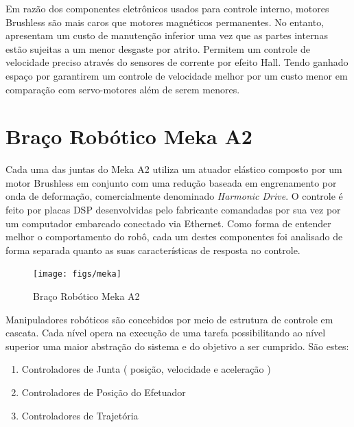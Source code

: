 Em razão dos componentes eletrônicos usados para controle interno, motores Brushless são mais caros que motores magnéticos permanentes. No entanto, apresentam um custo de manutenção inferior uma vez que as partes internas estão sujeitas a um menor desgaste por atrito. Permitem um controle de velocidade preciso através do sensores de corrente por efeito Hall. Tendo ganhado espaço por garantirem um controle de velocidade melhor por um custo menor em comparação com servo-motores além de serem menores.


\section{Braço Robótico Meka A2}

Cada uma das juntas do Meka A2 utiliza um atuador elástico composto por um motor Brushless em conjunto com uma redução baseada em engrenamento por onda de deformação, comercialmente denominado \textit{Harmonic Drive}. O controle é feito por placas DSP desenvolvidas pelo fabricante comandadas por sua vez por um computador embarcado conectado via Ethernet. Como forma de entender melhor o comportamento do robô, cada um destes componentes foi analisado de forma separada quanto as suas características de resposta no controle. 

\begin{figure}[H]
    \centering
    \texttt{[image: figs/meka]}
    \caption{Braço Robótico Meka A2}
    \label{fig:meka_arm}
\end{figure}

Manipuladores robóticos são concebidos por meio de estrutura de controle em cascata. Cada nível opera na execução de uma tarefa possibilitando ao nível superior uma maior abstração do sistema e do objetivo a ser cumprido. São estes:

\begin{enumerate}
    \item Controladores de Junta ( posição, velocidade e aceleração )
    \item Controladores de Posição do Efetuador
    \item Controladores de Trajetória
\end{enumerate}

